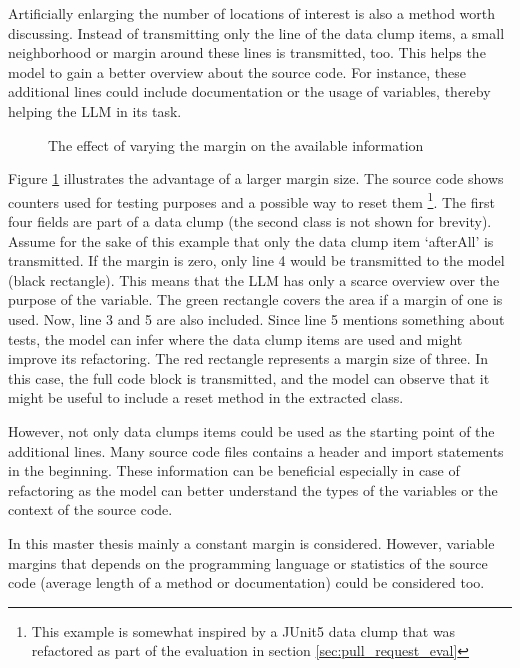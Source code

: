 Artificially enlarging the number of locations of interest is also a method worth discussing. Instead of transmitting only the line of the data clump items,  a small neighborhood or margin around these lines is transmitted, too. This helps the model to gain a better overview about the source code. For instance, these additional lines could include documentation or the usage of variables, thereby helping the \ac{LLM} in its task.

\begin{figure}
    \centering
    
    \caption{The effect of varying the margin on the available information}
    \label{fig:margin_effect}
\end{figure}

Figure \ref{fig:margin_effect} illustrates the advantage of a larger margin size. The source code shows counters used for testing purposes and a possible way to reset them \footnote{This example is somewhat inspired by a JUnit5 data clump that was refactored as part of the evaluation in section \ref{sec:pull_request_eval}}. The first four fields are part of a data clump (the second class is not shown for brevity). Assume for the sake of this example that only the data clump item \enquote*{afterAll} is transmitted. If the margin is zero, only line 4 would be transmitted to the model (black rectangle). This means that the \ac{LLM} has only a scarce overview over the purpose of the variable.
The green rectangle covers the area if a margin of one is used. Now, line 3 and 5 are also included. Since line 5 mentions something about tests, the model can infer where the data clump items are used and might improve its refactoring. The red rectangle represents a margin size of three. In this case, the full code block is transmitted, and the model can observe that it might be useful to include a reset method in the extracted class. 

However, not only data clumps items could be used as the starting point of the additional lines. Many source code files contains a header and import statements in the beginning. These information can be beneficial especially in case of refactoring as the model can better understand the types of the variables or the context of the source code.

In this master thesis mainly a constant margin is considered. However, variable margins that depends on the programming language or statistics of the source code (average length of a method or documentation) could be considered too.


